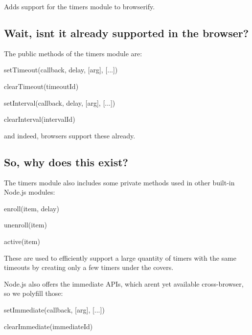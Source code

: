 Adds support for the {\ttfamily timers} module to browserify.

\subsection*{Wait, isn\textquotesingle{}t it already supported in the browser?}

The public methods of the {\ttfamily timers} module are\+:


\begin{DoxyItemize}
\item {\ttfamily set\+Timeout(callback, delay, \mbox{[}arg\mbox{]}, \mbox{[}...\mbox{]})}
\item {\ttfamily clear\+Timeout(timeout\+Id)}
\item {\ttfamily set\+Interval(callback, delay, \mbox{[}arg\mbox{]}, \mbox{[}...\mbox{]})}
\item {\ttfamily clear\+Interval(interval\+Id)}
\end{DoxyItemize}

and indeed, browsers support these already.

\subsection*{So, why does this exist?}

The {\ttfamily timers} module also includes some private methods used in other built-\/in Node.\+js modules\+:


\begin{DoxyItemize}
\item {\ttfamily enroll(item, delay)}
\item {\ttfamily unenroll(item)}
\item {\ttfamily active(item)}
\end{DoxyItemize}

These are used to efficiently support a large quantity of timers with the same timeouts by creating only a few timers under the covers.

Node.\+js also offers the {\ttfamily immediate} A\+P\+Is, which aren\textquotesingle{}t yet available cross-\/browser, so we polyfill those\+:


\begin{DoxyItemize}
\item {\ttfamily set\+Immediate(callback, \mbox{[}arg\mbox{]}, \mbox{[}...\mbox{]})}
\item {\ttfamily clear\+Immediate(immediate\+Id)}
\end{DoxyItemize}


